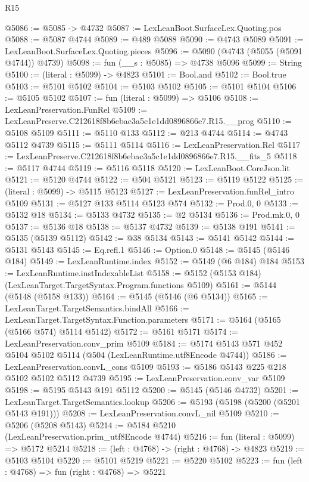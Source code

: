 \begin{lexlean}{R15}
\begin{coremodule}
{{{{{{{{{{{@5086 := @5085 -> @4732
@5087 := LexLeanBoot.SurfaceLex.Quoting.pos
@5088 := @5087 @4744
@5089 := @489 @5088
@5090 := @4743 @5089
@5091 := LexLeanBoot.SurfaceLex.Quoting.pieces
@5096 := @5090 (@4743 (@5055 (@5091 @4744)) @4739)
@5098 := fun (__s : @5085) => @4738 @5096
@5099 := String
@5100 := (literal : @5099) -> @4823
@5101 := Bool.and
@5102 := Bool.true
@5103 := @5101 @5102
@5104 := @5103 @5102
@5105 := @5101 @5104
@5106 := @5105 @5102
@5107 := fun (literal : @5099) => @5106
@5108 := LexLeanPreservation.FunRel
@5109 := LexLeanPreserve.C212618f8b6ebac3a5c1e1dd0896866e7.R15.__prog
@5110 := @5108 @5109
@5111 := @5110 @133
@5112 := @213 @4744
@5114 := @4743 @5112 @4739
@5115 := @5111 @5114
@5116 := LexLeanPreservation.Rel
@5117 := LexLeanPreserve.C212618f8b6ebac3a5c1e1dd0896866e7.R15.__fits_5
@5118 := @5117 @4744
@5119 := @5116 @5118
@5120 := LexLeanBoot.CoreJson.lit
@5121 := @5120 @4744
@5122 := @504 @5121
@5123 := @5119 @5122
@5125 := (literal : @5099) -> @5115 @5123
@5127 := LexLeanPreservation.funRel_intro @5109
@5131 := @5127 @133 @5114 @5123 @574
@5132 := Prod.{0, 0}
@5133 := @5132 @18
@5134 := @5133 @4732
@5135 := @2 @5134
@5136 := Prod.mk.{0, 0}
@5137 := @5136 @18
@5138 := @5137 @4732
@5139 := @5138 @191
@5141 := @5135 (@5139 @5112)
@5142 := @38 @5134
@5143 := @5141 @5142
@5144 := @5131 @5143
@5145 := Eq.refl.{1}
@5146 := Option.{0}
@5148 := @5145 (@5146 @184)
@5149 := LexLeanRuntime.index
@5152 := @5149 (@6 @184) @184
@5153 := LexLeanRuntime.instIndexableList
@5158 := @5152 (@5153 @184) (LexLeanTarget.TargetSyntax.Program.functions @5109)
@5161 := @5144 (@5148 (@5158 @133))
@5164 := @5145 (@5146 (@6 @5134))
@5165 := LexLeanTarget.TargetSemantics.bindAll
@5166 := LexLeanTarget.TargetSyntax.Function.parameters
@5171 := @5164 (@5165 (@5166 @574) @5114 @5142)
@5172 := @5161 @5171
@5174 := LexLeanPreservation.conv_prim @5109
@5184 := @5174 @5143 @571 @452 @5104 @5102 @5114 (@504 (LexLeanRuntime.utf8Encode @4744))
@5186 := LexLeanPreservation.convL_cons @5109
@5193 := @5186 @5143 @225 @218 @5102 @5102 @5112 @4739
@5195 := LexLeanPreservation.conv_var @5109
@5198 := @5195 @5143 @191 @5112
@5200 := @5145 (@5146 @4732)
@5201 := LexLeanTarget.TargetSemantics.lookup
@5206 := @5193 (@5198 (@5200 (@5201 @5143 @191)))
@5208 := LexLeanPreservation.convL_nil @5109
@5210 := @5206 (@5208 @5143)
@5214 := @5184 @5210 (LexLeanPreservation.prim_utf8Encode @4744)
@5216 := fun (literal : @5099) => @5172 @5214
@5218 := (left : @4768) -> (right : @4768) -> @4823
@5219 := @5103 @5104
@5220 := @5101 @5219
@5221 := @5220 @5102
@5223 := fun (left : @4768) => fun (right : @4768) => @5221
}}}}}}}}}}}
\end{coremodule}
\end{lexlean}
